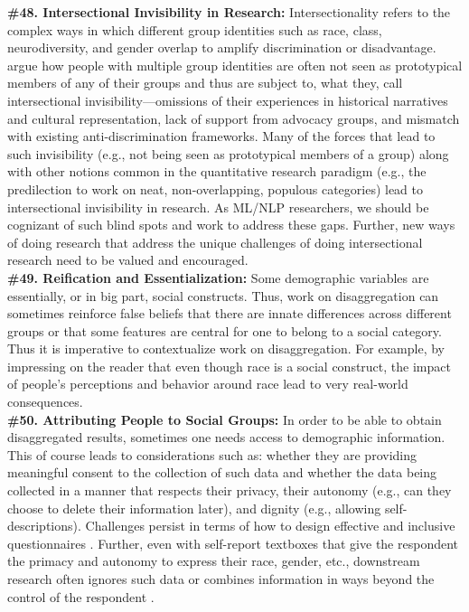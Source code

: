 \documentclass{clv3}
\begin{document}
\noindent \textbf{\#48. Intersectional Invisibility in Research:} Intersectionality refers to the complex ways in which different group identities such as race, class, neurodiversity, and gender overlap to amplify discrimination or disadvantage. \citet{purdie2008intersectional} argue how people with multiple group identities are often not seen as prototypical members of any of their groups and thus are subject to, what they, call intersectional invisibility---omissions of their experiences in historical narratives and cultural representation, lack of support from advocacy groups, and mismatch with existing anti-discrimination frameworks. Many of the forces that lead to such invisibility (e.g., not being seen as prototypical members of a group) along with other notions common in the quantitative research paradigm (e.g., the predilection to work on neat, non-overlapping, populous categories) lead to intersectional invisibility in research. As ML/NLP researchers, we should be cognizant of such blind spots %
and work to address these gaps. Further, new ways of doing research that address the unique challenges of doing intersectional research need to be valued and encouraged.\\[-2pt]

\noindent \textbf{\#49. Reification and Essentialization:} Some demographic variables are essentially, or in big part, social constructs. Thus, work on disaggregation can sometimes reinforce false beliefs that there are innate differences across different groups or that some features are central for one to belong to a social category. Thus it is imperative to contextualize work on disaggregation. For example, by impressing on the reader that even though race is a social construct, the impact of people’s perceptions and behavior around race lead to very real-world consequences.\\[-2pt]

\noindent \textbf{\#50. Attributing People to Social Groups:} In order to be able to obtain disaggregated results, sometimes one  needs access to demographic information. %
This of course leads to considerations such as: whether they are providing meaningful consent to the collection of such data and whether the data being collected in a manner that respects their privacy, their autonomy (e.g., can they choose to delete their information later), and dignity (e.g., allowing self-descriptions).
Challenges persist in terms of how to design effective and inclusive questionnaires \cite{bauer2017transgender}.
Further, even with self-report textboxes that give the respondent the primacy and autonomy to express their race, gender, etc.\@, downstream research often ignores such data or combines information in ways beyond the control of the respondent \cite{keyes_2019}.
\end{document}
